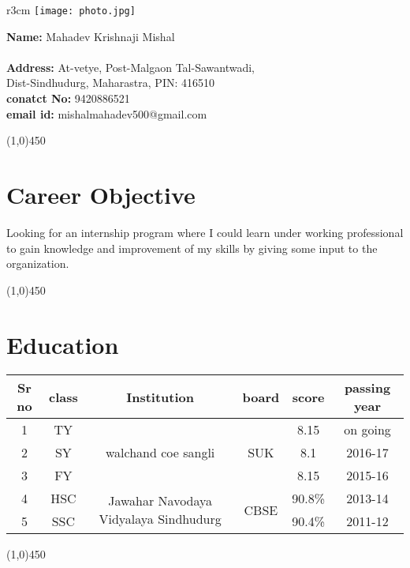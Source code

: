 \documentclass[10pt]{article}
\begin{document}
		\graphicspath{{photos/}}
	\begin{wrapfigure}{r}{3cm}
		\vspace{-20pt}
		\texttt{[image: photo.jpg]}
	\end{wrapfigure}
\textbf{Name:} Mahadev Krishnaji Mishal\\\\
\textbf{Address:} At-vetye, Post-Malgaon Tal-Sawantwadi,\\
Dist-Sindhudurg, Maharastra, PIN: 416510\\
\textbf{conatct No:} 9420886521\\
\textbf{email id:} mishalmahadev500@gmail.com

\begin{center}
	\line(1,0){450}
\end{center}

\section{Career Objective}
Looking for an internship program where I could learn under working professional to gain knowledge and improvement of my skills by giving some input to the organization.

\begin{center}
	\line(1,0){450}
\end{center}

\section{Education}
\begin{tabular}{||c|c|c|c|c|c||}
	\hline
	Sr no & class & Institution & board & score&passing year \\
	\hline
	1 &TY& \multirow{3}{*}{ walchand coe sangli} & \multirow{3}{*}{ SUK} & 8.15&on going\\
	2 &SY& && 8.1&2016-17\\ 
	3 &FY& && 8.15&2015-16\\\hline 
	4 &HSC&\multirow{2}{*}{Jawahar Navodaya Vidyalaya Sindhudurg} & \multirow{2}{*}{CBSE}&90.8\%&2013-14\\ 
	5 &SSC& &&90.4\%&2011-12\\
	\hline
\end{tabular}
\begin{center}
	\line(1,0){450}
\end{center}
\end{document}
